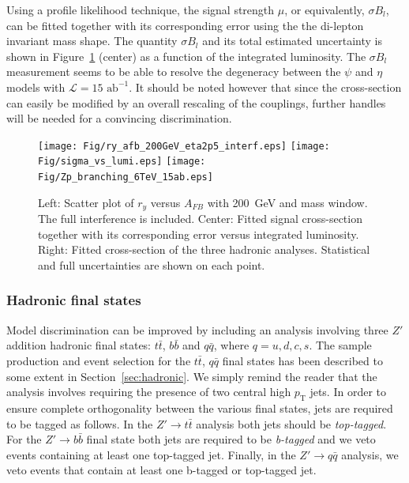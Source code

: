 \documentclass[a4paper,11pt]{article}
\newcommand{\pt}{\ensuremath{p_{\text{T}}}}
\newcommand*{\intlumihelhc}{\ensuremath{\mathcal{L}=15\,\text{ab}^{-1}}}
\renewcommand*{\intlumihelhc}{\ensuremath{\mathcal{L}=15\text{ ab}^{-1}}}
\begin{document}
Using a profile likelihood technique, the signal strength $\mu$, or equivalently, $\sigma B_l$, can be fitted together with its corresponding error using the the di-lepton invariant mass shape. The quantity $\sigma B_l$ and its total estimated uncertainty is shown in Figure~\ref{fig:ana:res} (center) as a function of the integrated luminosity. The $\sigma B_l$ measurement seems to be able to resolve the degeneracy between the $\psi$ and $\eta$ models with \intlumihelhc. It should be noted however that since the cross-section can easily be modified by an overall rescaling of the couplings, further handles will be needed for a convincing discrimination.

\begin{figure}[!htb]
  \centering
   \texttt{[image: Fig/ry\_afb\_200GeV\_eta2p5\_interf.eps]}
   \texttt{[image: Fig/sigma\_vs\_lumi.eps]}
   \texttt{[image: Fig/Zp\_branching\_6TeV\_15ab.eps]}
  \caption{Left: Scatter plot of $r_y$ versus $A_{FB}$ with 200~GeV and mass window. The full interference is included. Center: Fitted signal cross-section together with its corresponding error versus integrated luminosity. Right: Fitted cross-section of the three hadronic analyses. Statistical and full uncertainties are shown on each point.}
  \label{fig:ana:res}
\end{figure}

\subsubsection{Hadronic final states}
\label{par:hadana}

Model discrimination can be improved by including an analysis involving three $Z'$ addition hadronic final states: $t\bar{t}$, $b\bar{b}$ and $q\bar{q}$, where $q=u,d,c,s$. The sample production and event selection for the $t\bar{t}$, $q\bar{q}$ final states has been described to some extent in Section~\ref{sec:hadronic}. We simply remind the reader that the analysis involves requiring the presence of two central high $\pt$ jets. In order to ensure complete orthogonality between the various final states, jets are required to be tagged as follows. In the $Z' \rightarrow t\bar{t}$ analysis both jets should be \emph{top-tagged}. For the $Z' \rightarrow b\bar{b}$ final state both jets are required to be \emph{b-tagged} and we veto events containing at least one top-tagged jet. Finally, in the $Z' \rightarrow q\bar{q}$ analysis, we veto events that contain at least one b-tagged or top-tagged jet.
\end{document}
